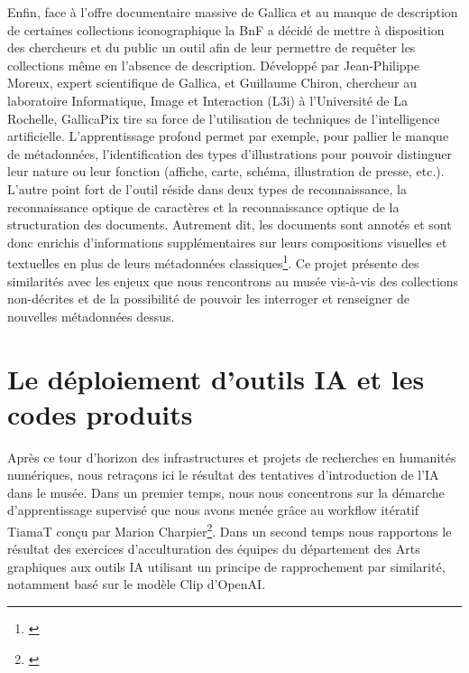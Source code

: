 Enfin, face à l'offre documentaire massive de Gallica et au manque de description de certaines collections iconographique la BnF a décidé de mettre à disposition des chercheurs et du public un outil afin de leur permettre de requêter les collections même en l'absence de description. Développé par Jean-Philippe Moreux, expert scientifique de Gallica, et Guillaume Chiron, chercheur au laboratoire Informatique, Image et Interaction (L3i) à l'Université de La Rochelle, GallicaPix tire sa force de l’utilisation de techniques de l'intelligence artificielle. L’apprentissage profond permet par exemple, pour pallier le manque de métadonnées, l’identification des types d’illustrations pour pouvoir distinguer leur nature ou leur fonction (affiche, carte, schéma, illustration de presse, etc.). L’autre point fort de l’outil réside dans deux types de reconnaissance, la reconnaissance optique de caractères et la reconnaissance optique de la structuration des documents. Autrement dit, les documents sont annotés et sont donc enrichis d’informations supplémentaires sur leurs compositions visuelles et textuelles en plus de leurs métadonnées classiques\footnote{\cite{noauthor_gallicapix_nodate}}. Ce projet présente des similarités avec les enjeux que nous rencontrons au musée vis-à-vis des collections non-décrites et de la possibilité de pouvoir les interroger et renseigner de nouvelles métadonnées dessus.


\chapter{Le déploiement d’outils IA et les codes produits}

Après ce tour d'horizon des infrastructures et projets de recherches en humanités numériques, nous retraçons ici le résultat des tentatives d'introduction de l'IA dans le musée. Dans un premier temps, nous nous concentrons sur la démarche d'apprentissage supervisé que nous avons menée grâce au workflow itératif TiamaT conçu par Marion Charpier\footnote{\cite{chaouabti_chaouabtitiamat_2025}}. Dans un second temps nous rapportons le résultat des exercices d'acculturation des équipes du département des Arts graphiques aux outils IA utilisant un principe de rapprochement par similarité, notamment basé sur le modèle Clip d'OpenAI. 

